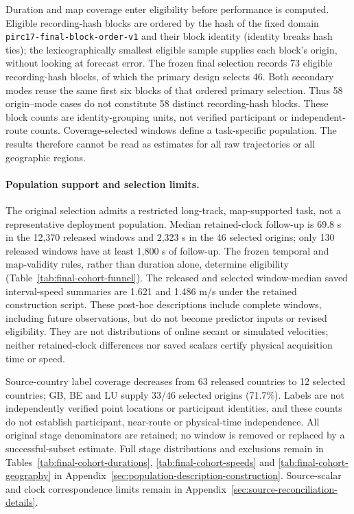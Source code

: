 \documentclass[11pt]{article}
\begin{document}
Duration and map coverage enter eligibility before performance is computed.
Eligible recording-hash blocks are ordered by the hash of the fixed domain
\texttt{pirc17-final-block-order-v1} and their block identity (identity breaks
hash ties); the lexicographically smallest eligible sample supplies each
block's origin, without looking at forecast error. The frozen
final selection records 73 eligible recording-hash blocks, of which the primary
design selects 46. Both secondary modes reuse the same first six blocks of
that ordered primary selection. Thus 58 origin--mode cases do not constitute
58 distinct recording-hash blocks. These block counts are identity-grouping
units, not verified participant or independent-route counts. Coverage-selected
windows define a task-specific population. The results therefore cannot be
read as estimates for all raw trajectories or all geographic regions.

\paragraph{Population support and selection limits.}\label{sec:population-support-summary}
The original selection admits a restricted long-track, map-supported task,
not a representative deployment population. Median retained-clock follow-up
is 69.8 s in the 12,370 released windows and 2,323 s in the 46 selected
origins; only 130 released windows have at least 1,800 s of follow-up.
The frozen temporal and map-validity rules, rather than duration alone,
determine eligibility (Table~\ref{tab:final-cohort-funnel}).
The released and selected window-median saved interval-speed summaries
are 1.621 and 1.486 m/s under the retained construction script. These
post-hoc descriptions include complete windows, including future
observations, but do not become predictor inputs or revised eligibility.
They are not distributions of online secant or simulated velocities;
neither retained-clock differences nor saved scalars certify physical
acquisition time or speed.

Source-country label coverage decreases from 63 released countries to
12 selected countries; GB, BE and LU supply 33/46 selected origins (71.7\%).
Labels are not independently verified point locations or participant
identities, and these counts do not establish participant, near-route or
physical-time independence. All original stage denominators are retained;
no window is removed or replaced by a successful-subset estimate.
Full stage distributions and exclusions remain in
Tables~\ref{tab:final-cohort-durations}, \ref{tab:final-cohort-speeds} and
\ref{tab:final-cohort-geography} in
Appendix~\ref{sec:population-description-construction}. Source-scalar and
clock correspondence limits remain in
Appendix~\ref{sec:source-reconciliation-details}.
\end{document}
